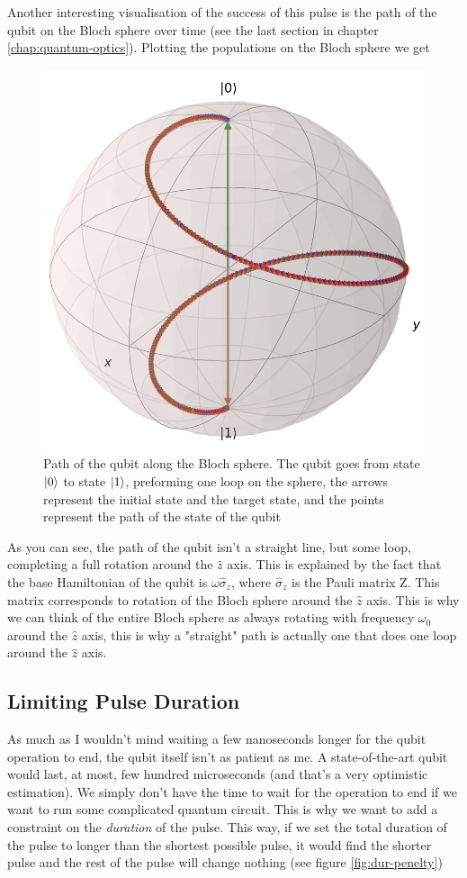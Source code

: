 Another interesting visualisation of the success of this pulse is the path of the qubit on the Bloch sphere over time (see the last section in chapter \ref{chap:quantum-optics}). Plotting the populations on the Bloch sphere we get 
\begin{figure}[H]
    \centering
    \includegraphics[width=0.4\columnwidth]{Results/qubit-band-amp-const/Bloch-qubit.png}
    \caption{Path of the qubit along the Bloch sphere. The qubit goes from state $\ket{0}$ to state $\ket{1}$, preforming one loop on the sphere, the arrows represent the initial state and the target state, and the points represent the path of the state of the qubit}
    \label{fig:band-amp-const-blcoh}
\end{figure}
As you can see, the path of the qubit isn't a straight line, but some loop, completing a full rotation around the $\hat{z}$ axis. This is explained by the fact that the base Hamiltonian of the qubit is $\omega \hat{\sigma}_z$, where $\hat{\sigma}_z$ is the Pauli matrix Z. This matrix corresponds to rotation of the Bloch sphere around the $\hat{z}$ axis. This is why we can think of the entire Bloch sphere as always rotating with frequency $\omega_0$ around the $\hat{z}$ axis, this is why a "straight" path is actually one that does one loop around the $\hat{z}$ axis.

\subsection{Limiting Pulse Duration}
As much as I wouldn't mind waiting a few nanoseconds longer for the qubit operation to end, the qubit itself isn't as patient as me. A state-of-the-art qubit would last, at most, few hundred microseconds (and that's a very optimistic estimation). We simply don't have the time to wait for the operation to end if we want to run some complicated quantum circuit. This is why we want to add a constraint on the \textit{duration} of the pulse. This way, if we set the total duration of the pulse to longer than the shortest possible pulse, it would find the shorter pulse and the rest of the pulse will change nothing (see figure \ref{fig:dur-penelty})

